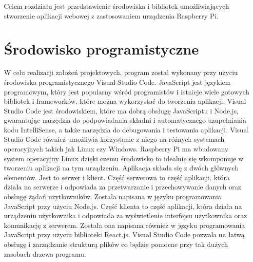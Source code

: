 Celem rozdziału jest przedstawienie środowiska i bibliotek umożliwiających stworzenie aplikacji webowej z zastosowaniem urządzenia Raspberry Pi.

\section{Środowisko programistyczne}
W celu realizacji założeń projektowych, program został wykonany przy użyciu środowiska programistycznego Visual Studio Code. JavaScript jest językiem programowym, który jest popularny wśród programistów i istnieje wiele gotowych bibliotek i frameworków, które można wykorzystać do tworzenia aplikacji. Visual Studio Code jest środowiskiem, które ma dobrą obsługę JavaScriptu i Node.js, gwarantując narzędzia do podpowiadania składni i automatycznego uzupełniania kodu IntelliSense, a także narzędzia do debugowania i testowania aplikacji. Visual Studio Code również umożliwia korzystanie z niego na różnych systemach operacyjnych takich jak Linux czy Windows. Raspberry Pi ma wbudowany system operacyjny Linux dzięki czemu środowisko to idealnie się wkomponuje w tworzeniu aplikacji na tym urządzeniu. Aplikacja składa się z dwóch głównych elementów. Jest to serwer i klient. Część serwerowa to część aplikacji, która działa na serwerze i odpowiada za przetwarzanie i przechowywanie danych oraz obsługę żądań użytkowników. Została napisana w języku programowania JavaScript przy użyciu Node.js. Część klienta to część aplikacji, która działa na urządzeniu użytkownika i odpowiada za wyświetlenie interfejsu użytkownika oraz komunikację z serwerem. Została ona napisana również w języku programowania JavaScript przy użyciu biblioteki React.js. Visual Studio Code pozwala na łatwą obsługę i zarządzanie strukturą plików co będzie pomocne przy tak dużych zasobach drzewa programu.

